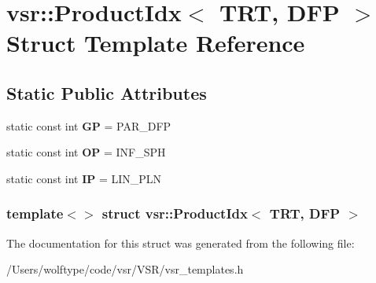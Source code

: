 \hypertarget{structvsr_1_1_product_idx_3_01_t_r_t_00_01_d_f_p_01_4}{\section{vsr\-:\-:Product\-Idx$<$ T\-R\-T, D\-F\-P $>$ Struct Template Reference}
\label{structvsr_1_1_product_idx_3_01_t_r_t_00_01_d_f_p_01_4}
}
\subsection*{Static Public Attributes}
\begin{DoxyCompactItemize}
\item 
\hypertarget{structvsr_1_1_product_idx_3_01_t_r_t_00_01_d_f_p_01_4_a4054d90caebe2d11066e1ec91abde5ed}{static const int {\bfseries G\-P} = P\-A\-R\-\_\-\-D\-F\-P}\label{structvsr_1_1_product_idx_3_01_t_r_t_00_01_d_f_p_01_4_a4054d90caebe2d11066e1ec91abde5ed}

\item 
\hypertarget{structvsr_1_1_product_idx_3_01_t_r_t_00_01_d_f_p_01_4_a123cbb7ee3a6405c98d4ad6049bbcf77}{static const int {\bfseries O\-P} = I\-N\-F\-\_\-\-S\-P\-H}\label{structvsr_1_1_product_idx_3_01_t_r_t_00_01_d_f_p_01_4_a123cbb7ee3a6405c98d4ad6049bbcf77}

\item 
\hypertarget{structvsr_1_1_product_idx_3_01_t_r_t_00_01_d_f_p_01_4_ab48e81e103f12418792b95760eec6a43}{static const int {\bfseries I\-P} = L\-I\-N\-\_\-\-P\-L\-N}\label{structvsr_1_1_product_idx_3_01_t_r_t_00_01_d_f_p_01_4_ab48e81e103f12418792b95760eec6a43}

\end{DoxyCompactItemize}
\subsubsection*{template$<$$>$ struct vsr\-::\-Product\-Idx$<$ T\-R\-T, D\-F\-P $>$}



The documentation for this struct was generated from the following file\-:\begin{DoxyCompactItemize}
\item 
/\-Users/wolftype/code/vsr/\-V\-S\-R/vsr\-\_\-templates.\-h\end{DoxyCompactItemize}
